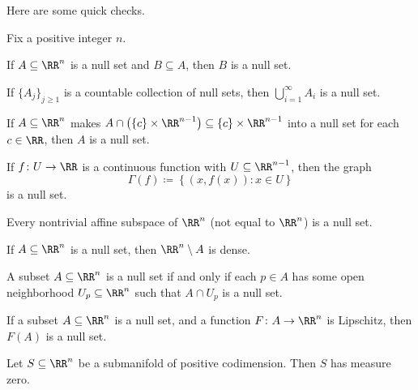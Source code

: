 \documentclass[../notes.tex]{subfiles}
\begin{document}
Here are some quick checks.
\begin{lemma} \label{lem:null-set-checks}
	Fix a positive integer $n$.
	\begin{listalph}
		\item If $A\subseteq\RR^n$ is a null set and $B\subseteq A$, then $B$ is a null set.
		\item If $\{A_j\}_{j\ge1}$ is a countable collection of null sets, then $\bigcup_{i=1}^\infty A_i$ is a null set.
		\item If $A\subseteq\RR^n$ makes $A\cap\left(\{c\}\times\RR^{n-1}\right)\subseteq\{c\}\times\RR^{n-1}$ into a null set for each $c\in\RR$, then $A$ is a null set.
		\item If $f\colon U\to\RR$ is a continuous function with $U\subseteq\RR^{n-1}$, then the graph
		\[\Gamma(f)\coloneqq\left\{(x,f(x)):x\in U\right\}\]
		is a null set.
		\item Every nontrivial affine subspace of $\RR^n$ (not equal to $\RR^n$) is a null set.
		\item If $A\subseteq\RR^n$ is a null set, then $\RR^n\setminus A$ is dense.
		\item A subset $A\subseteq\RR^n$ is a null set if and only if each $p\in A$ has some open neighborhood $U_p\subseteq\RR^n$ such that $A\cap U_p$ is a null set.
		\item If a subset $A\subseteq\RR^n$ is a null set, and a function $F\colon A\to\RR^n$ is Lipschitz, then $F(A)$ is a null set.
		\item Let $S\subseteq\RR^n$ be a submanifold of positive codimension. Then $S$ has measure zero.
	\end{listalph}
\end{lemma}
\end{document}
